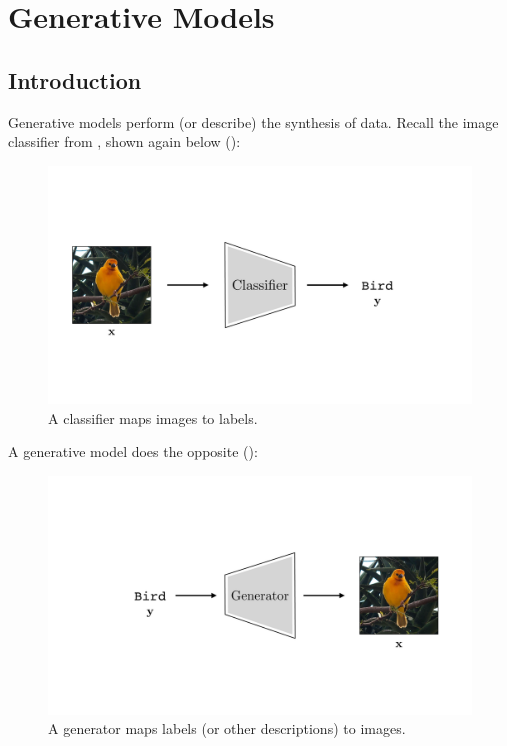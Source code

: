 
\allowdisplaybreaks %

\chapter{Generative Models}
\label{chapter:generative_models}

\section{Introduction}
Generative models perform (or describe) the synthesis of data. Recall the image classifier from \chap{\ref{chapter:intro_to_learning}}, shown again below (\fig{\ref{fig:gen_models_image_classification}}):

\begin{figure}[h]
    \centerline{
    \includegraphics[width=0.7\linewidth]{./figures/generative_models/image_classification_bird.pdf}
    }
    \caption{A classifier maps images to labels.}
    \label{fig:gen_models_image_classification}
\end{figure}

A generative model does the opposite (\fig{\ref{fig:gen_models_image_generation}}):

\begin{figure}[h]
    \centerline{
    \hspace*{0.05\linewidth}\includegraphics[width=0.7\linewidth]{./figures/generative_models/image_generation_bird.pdf}
    }
    \caption{A generator maps labels (or other descriptions) to images.}
    \label{fig:gen_models_image_generation}
\end{figure}

